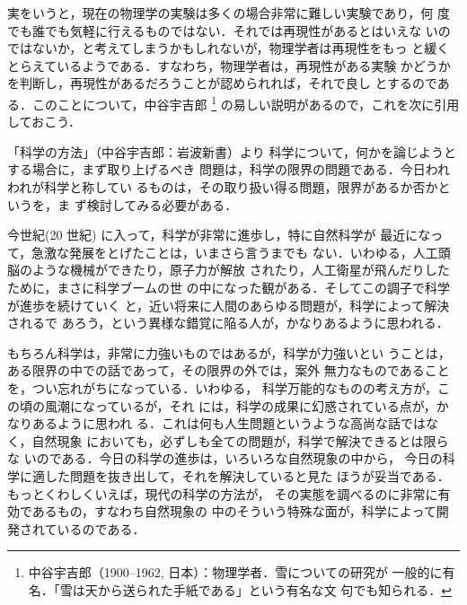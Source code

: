             実をいうと，現在の物理学の実験は多くの場合非常に難しい実験であり，何
            度でも誰でも気軽に行えるものではない．それでは再現性があるとはいえな
            いのではないか，と考えてしまうかもしれないが，物理学者は再現性をもっ
            と緩くとらえているようである．すなわち，物理学者は，再現性がある実験
            かどうかを判断し，再現性があるだろうことが認められれば，それで良し
            とするのである．このことについて，中谷宇吉郎
                \footnote{
                    中谷宇吉郎（1900--1962, 日本）：物理学者．雪についての研究が
                    一般的に有名．「雪は天から送られた手紙である」という有名な文
                    句でも知られる．
                }
            の易しい説明があるので，これを次に引用しておこう．
                                \begin{memo}{「科学の方法」（中谷宇吉郎：岩波新書）より}
                    科学について，何かを論じようとする場合に，まず取り上げるべき
                    問題は，科学の限界の問題である．今日われわれが科学と称してい
                    るものは，その取り扱い得る問題，限界があるか否かというを，ま
                    ず検討してみる必要がある．

                    今世紀(20 世紀) に入って，科学が非常に進歩し，特に自然科学が
                    最近になって，急激な発展をとげたことは，いまさら言うまでも
                    ない．いわゆる，人工頭脳のような機械ができたり，原子力が解放
                    されたり，人工衛星が飛んだりしたために，まさに科学ブームの世
                    の中になった観がある．そしてこの調子で科学が進歩を続けていく
                    と，近い将来に人間のあらゆる問題が，科学によって解決されるで
                    あろう，という異様な錯覚に陥る人が，かなりあるように思われる．

                    もちろん科学は，非常に力強いものではあるが，科学が力強いとい
                    うことは，ある限界の中での話であって，その限界の外では，案外
                    無力なものであることを，つい忘れがちになっている．いわゆる，
                    科学万能的なものの考え方が，この頃の風潮になっているが，それ
                    には，科学の成果に幻惑されている点が，かなりあるように思われ
                    る．これは何も人生問題というような高尚な話ではなく，自然現象
                    においても，必ずしも全ての問題が，科学で解決できるとは限らな
                    いのである．今日の科学の進歩は，いろいろな自然現象の中から，
                    今日の科学に適した問題を抜き出して，それを解決していると見た
                    ほうが妥当である．もっとくわしくいえば，現代の科学の方法が，
                    その実態を調べるのに非常に有効であるもの，すなわち自然現象の
                    中のそういう特殊な面が，科学によって開発されているのである．


\end{memo}
